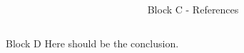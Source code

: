 \documentclass{beamer}
\begin{document}
\begin{frame}{}
 	\vfill
 	
 	\begin{columns}[t]
 		\begin{column}{0.5\linewidth}
		\end{column}
		\begin{column}{0.5\linewidth}
 			\begin{block}{\LARGE Block C - References}
 			\vspace{6cm}
 			\blindtext
     		\end{block}
		\end{column}
 	\end{columns}
 	
 	\vskip 15cm
 	
 	\begin{block}{Block D}
 	Here should be the conclusion. \blindtext
 	\end{block}
	
  \end{frame}
\end{document}
